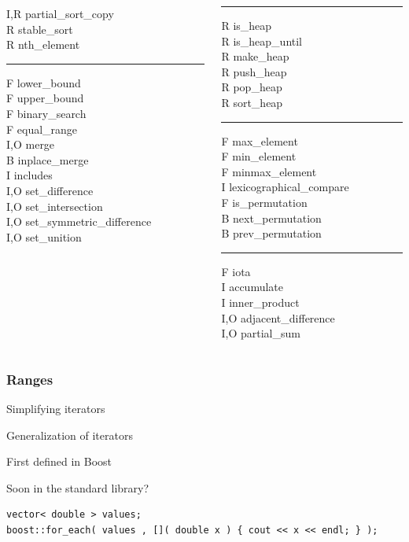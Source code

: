 \documentclass{beamer}
\newcommand{\heading}[1]{\frametitle{#1}}
\begin{document}
{\begin{columns}[T]
\begin{column}{0.3\textwidth}
      I,R partial\_sort\_copy \\
      R stable\_sort \\
      R nth\_element \\
      \hrule
      F lower\_bound \\
      F upper\_bound \\
      F binary\_search \\
      F equal\_range \\
      I,O merge \\
      B inplace\_merge \\
      I includes \\
      I,O set\_difference \\
      I,O set\_intersection \\
      I,O set\_symmetric\_difference \\
      I,O set\_unition 
    \end{column}
    \begin{column}{0.3\textwidth}
      \hrule
      R is\_heap \\
      R is\_heap\_until \\
      R make\_heap \\
      R push\_heap \\
      R pop\_heap \\
      R sort\_heap \\
      \hrule
      F max\_element \\
      F min\_element \\
      F minmax\_element \\
      I lexicographical\_compare \\
      F is\_permutation \\
      B next\_permutation \\
      B prev\_permutation \\
      \hrule
      F iota \\
      I accumulate \\
      I inner\_product \\
      I,O adjacent\_difference \\
      I,O partial\_sum
   \end{column}
  \end{columns}


}


\begin{frame}[fragile]
  \heading{Ranges}
  
  Simplifying iterators
  
  Generalization of iterators
  
  First defined in Boost
  
  Soon in the standard library?

  \begin{lstlisting}
vector< double > values;
boost::for_each( values , []( double x ) { cout << x << endl; } );
  \end{lstlisting}


\end{frame}
\end{document}
